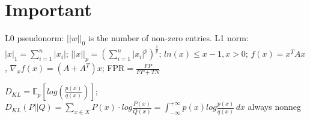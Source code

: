 \section*{Important}
L0 pseudonorm: $||w||_0$ is the number of non-zero entries.
L1 norm: $|x|_1 = \sum_{i=1}^n |x_i|$; $||x||_p = (\sum_{i=1}^n|x_i|^p)^{\frac{1}{p}}$;
$ln(x) \leq x - 1, x>0$; $f(x) = x^T A x$, $\nabla_x f(x) = (A + A^T) x$; FPR$=\frac{FP}{FP+TN}$ 

$D_{KL} = \mathbb{E}_p[log(\frac{p(x)}{q(x)})]$; $D_{KL} (P||Q) = \sum_{x \in X}P(x) \cdot log \frac{P(x)}{Q(x)} =  \int_{-\infty}^{+\infty} p(x) log \frac{p(x)}{q(x)} \, dx $ always nonneg




